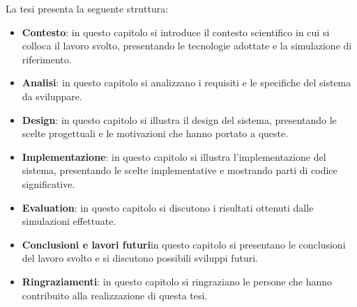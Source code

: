 La tesi presenta la seguente struttura:
\begin{itemize}
    \item \textbf{Contesto}: in questo capitolo si introduce il contesto scientifico in cui si colloca il lavoro svolto,
    presentando le tecnologie adottate e la simulazione di riferimento.
    \item \textbf{Analisi}: in questo capitolo si analizzano i requisiti e le specifiche del sistema da sviluppare.
    \item \textbf{Design}: in questo capitolo si illustra il design del sistema, presentando le scelte progettuali e le motivazioni che hanno portato a queste.
    \item \textbf{Implementazione}: in questo capitolo si illustra l'implementazione del sistema, presentando le scelte implementative e mostrando parti di codice significative.
    \item \textbf{Evaluation}: in questo capitolo si discutono i risultati ottenuti dalle simulazioni effettuate.
    \item \textbf{Conclusioni e lavori futuri}in questo capitolo si presentano le conclusioni del lavoro svolto e si discutono possibili sviluppi futuri.
    \item \textbf{Ringraziamenti}: in questo capitolo si ringraziano le persone che hanno contribuito alla realizzazione di questa tesi.
\end{itemize}